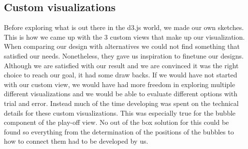 \documentclass[]{sigchi}
\begin{document}
\subsection{Custom visualizations}
Before exploring what is out there in the d3.js world, we made our own sketches.
This is how we came up with the 3 custom views that make up our visualization.
When comparing our design with alternatives we could not find something that
satisfied our needs. Nonetheless, they gave us inspiration to finetune our
designs. Although we are satisfied with our result and we are convinced it was
the right choice to reach our goal, it had some draw backs. If we would have not started with our custom view, we would have had more freedom in exploring multiple different visualizations and we would be able to evaluate different options with trial and error. Instead much of the time developing was spent on the technical details for these custom visualizations. This was especially true for the bubble component of the play-off view. No out of the box solution for this could be found so everything from the determination of the positions of the bubbles to how to connect them had to be developed by us.
\end{document}
